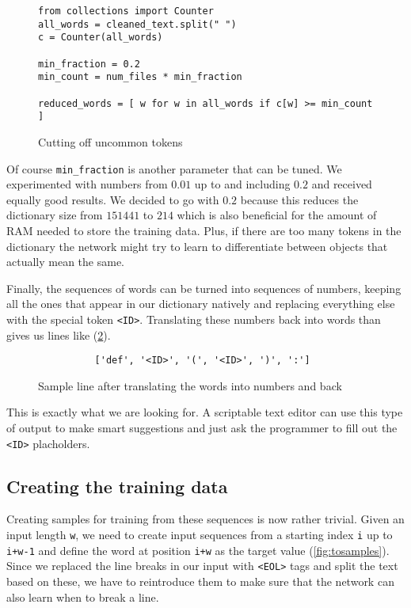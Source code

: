     \begin{figure}[htpb]
      \centering
  \begin{lstlisting}
from collections import Counter
all_words = cleaned_text.split(" ")
c = Counter(all_words)

min_fraction = 0.2
min_count = num_files * min_fraction

reduced_words = [ w for w in all_words if c[w] >= min_count ] \end{lstlisting}
      \caption{Cutting off uncommon tokens}
      \label{fig:downsamp}
    \end{figure}

    Of course \verb+min_fraction+ is another parameter that can be tuned. We experimented with numbers 
    from $0.01$ up to and including $0.2$ and received equally good results. We decided to go with $0.2$ because this
    reduces the dictionary size from $151441$ to $214$ which is also beneficial for the amount of RAM needed
    to store the training data. Plus, if there are too many tokens in the dictionary the network might
    try to learn to differentiate between objects that actually mean the same.

    Finally, the sequences of words can be turned into sequences of numbers, keeping all the ones that appear in
    our dictionary natively and replacing everything else with the special token \verb+<ID>+. Translating
    these numbers back into words than gives us lines like (\ref{fig:goodsample}).

    \begin{figure}[htpb]
      \centering
      \begin{verbatim}
          ['def', '<ID>', '(', '<ID>', ')', ':'] \end{verbatim}
      \caption{Sample line after translating the words into numbers and back}
      \label{fig:goodsample}
    \end{figure}

    This is exactly what we are looking for. A scriptable text editor
    can use this type of output to make smart suggestions and just ask the programmer to fill out the \verb+<ID>+ placholders.

    \subsection{Creating the training data}
    \label{sub:creating_the_training_data}
    
      Creating samples for training from these sequences is now rather trivial. Given an input length \verb+w+, we need
      to create input sequences from a starting index \verb+i+ up to \verb|i+w-1| and define the word at position
      \verb|i+w| as the target value (\ref{fig:tosamples}). Since we replaced the line breaks in our input with
      \verb+<EOL>+ tags and split the text based on these, we have to reintroduce them to make sure that
      the network can also learn when to break a line.

